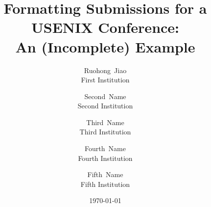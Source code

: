 \title{\Large\bf Formatting Submissions for a USENIX Conference:\\
	An (Incomplete) Example\\
}
\author{%
    {\rm Ruohong~Jiao}\\
	First Institution
	\and
	{\rm Second~Name}\\
	Second Institution
	\and
	{\rm Third~Name}\\
	Third Institution
	\and
	{\rm Fourth~Name}\\
	Fourth Institution
	\and
	{\rm Fifth~Name}\\
	Fifth Institution
}
\date{\today}
